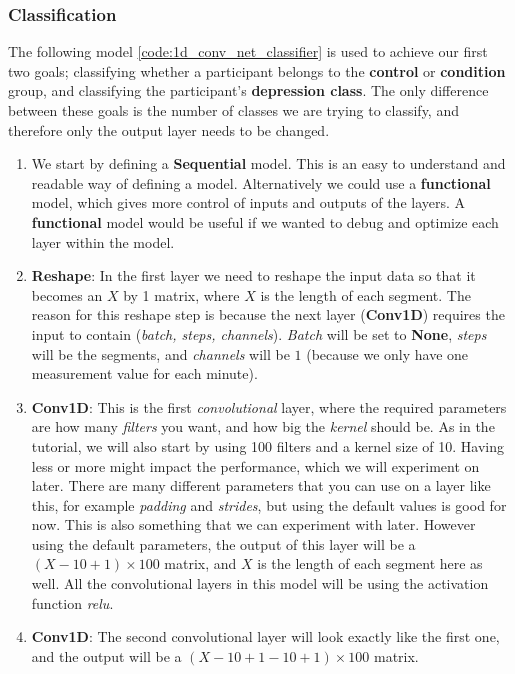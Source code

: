 \subsubsection{Classification}
The following model \ref{code:1d_conv_net_classifier} is used to achieve our first two goals; classifying whether a 
participant belongs to the \textbf{control} or \textbf{condition} group, and classifying the participant's \textbf{depression class}.
The only difference between these goals is the number of classes we are trying to classify, and therefore only the output layer needs to be changed.

\begin{enumerate}
  \item We start by defining a \textbf{Sequential} model. This is an easy to understand and readable way of defining a model. 
        Alternatively we could use a \textbf{functional} model, which gives more control of inputs and outputs of the layers.
        A \textbf{functional} model would be useful if we wanted to debug and optimize each layer within the model.
  \item \textbf{Reshape}: In the first layer we need to reshape the input data so that it becomes an $X$ by 1 matrix, where $X$ is the length of each segment.
        The reason for this reshape step is because the next layer (\textbf{Conv1D}) requires the input to contain (\textit{batch, steps, channels}). 
        \textit{Batch} will be set to \textbf{None}, \textit{steps} will be the segments, and \textit{channels} will be $1$ 
        (because we only have one measurement value for each minute).
  \item \textbf{Conv1D}: This is the first \textit{convolutional} layer, where the required parameters are how many \textit{filters} 
        you want, and how big the \textit{kernel} should be. As in the tutorial, we will also start by using 100 filters and a kernel size of 10. 
        Having less or more might impact the performance, which we will experiment on later.
        There are many different parameters that you can use on a layer like this, for example \textit{padding} and \textit{strides},
        but using the default values is good for now. This is also something that we can experiment with later.
        However using the default parameters, the output of this layer will be a $(X-10+1) \times 100$ matrix, 
        and $X$ is the length of each segment here as well. All the convolutional layers in this model will be using the activation function \textit{relu}.
  \item \textbf{Conv1D}: The second convolutional layer will look exactly like the first one, and the output will be a $(X-10+1-10+1) \times 100$ matrix. 

\end{enumerate}
